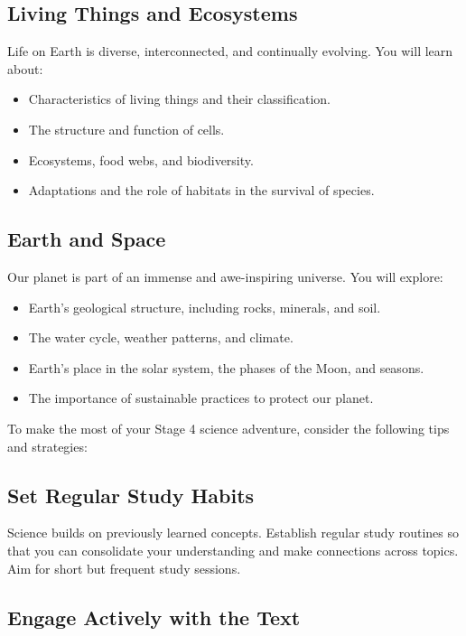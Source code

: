 \subsection{Living Things and Ecosystems}

Life on Earth is diverse, interconnected, and continually evolving. You will learn about:

\begin{itemize}
\item Characteristics of living things and their classification.
\item The structure and function of cells.
\item Ecosystems, food webs, and biodiversity.
\item Adaptations and the role of habitats in the survival of species.
\end{itemize}

\subsection{Earth and Space}

Our planet is part of an immense and awe-inspiring universe. You will explore:

\begin{itemize}
\item Earth's geological structure, including rocks, minerals, and soil.
\item The water cycle, weather patterns, and climate.
\item Earth's place in the solar system, the phases of the Moon, and seasons.
\item The importance of sustainable practices to protect our planet.
\end{itemize}

\FloatBarrier

\FloatBarrier
\1

To make the most of your Stage 4 science adventure, consider the following tips and strategies:

\subsection{Set Regular Study Habits}

Science builds on previously learned concepts. Establish regular study routines so that you can consolidate your understanding and make connections across topics. Aim for short but frequent study sessions.

\subsection{Engage Actively with the Text}

